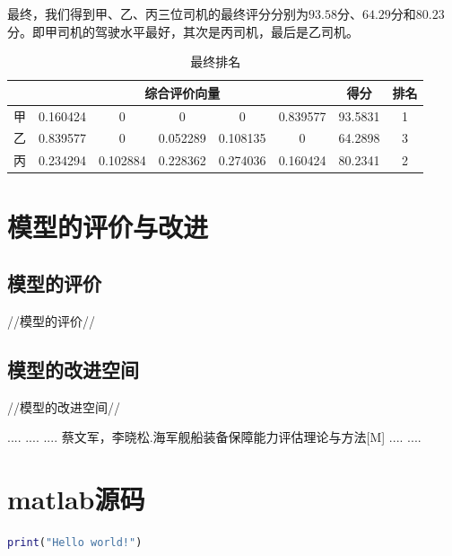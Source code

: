 \documentclass[bwprint]{cumcmthesis}
\begin{document}
            最终，我们得到甲、乙、丙三位司机的最终评分分别为$93.58$分、$64.29$分和$80.23$分。即甲司机的驾驶水平最好，其次是丙司机，最后是乙司机。
            \begin{table}[htbp]
                \centering
                \caption{最终排名}
                    \begin{tabular}{|c|c|c|c|c|c|c|c|}
                    \hline
                            & \multicolumn{5}{c|}{综合评价向量}    & 得分    & 排名 \\
                    \hline
                    甲     & 0.160424 & 0     & 0     & 0     & 0.839577 & 93.5831 & 1 \\
                    \hline
                    乙     & 0.839577 & 0     & 0.052289 & 0.108135 & 0     & 64.2898 & 3 \\
                    \hline
                    丙     & 0.234294 & 0.102884 & 0.228362 & 0.274036 & 0.160424 & 80.2341 & 2 \\
                    \hline
                    \end{tabular}
                \label{tab:eleven}
            \end{table}

    \section{模型的评价与改进}
    \subsection{模型的评价}
    //模型的评价//
    \subsection{模型的改进空间}
    //模型的改进空间//
    \begin{thebibliography}{9}
         ....
         ....
         ....
         蔡文军，李晓松.海军舰船装备保障能力评估理论与方法[M]
         ....
         ....
        
    \end{thebibliography}
    \newpage
    \appendix
        \section{matlab源码}
        \begin{lstlisting}[language=matlab]
            print("Hello world!")
        \end{lstlisting}
\end{document}
